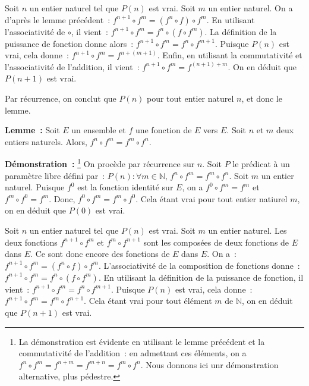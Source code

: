     Soit $n$ un entier naturel tel que $P(n)$ est vrai. 
    Soit $m$ un entier naturel. 
    On a d'après le lemme précédent : $f^{n+1} \circ f^m = (f^n \circ f) \circ f^m$. 
    En utilisant l'associativité de $\circ$, il vient : $f^{n+1} \circ f^m = f^n \circ (f \circ f^m)$. 
    La définition de la puissance de fonction donne alors : $f^{n+1} \circ f^m = f^n \circ f^{m+1}$. 
    Puisque $P(n)$ est vrai, cela donne : $f^{n+1} \circ f^m = f^{n+(m+1)}$. 
    Enfin, en utilisant la commutativité et l'associativité de l'addition, il vient : $f^{n+1} \circ f^m = f^{(n+1)+m}$. 
    On en déduit que $P(n+1)$ est vrai. 

    Par récurrence, on conclut que $P(n)$ pour tout entier naturel $n$, et donc le lemme.

   \done 

\medskip

\noindent\textbf{Lemme :} 
    Soit $E$ un ensemble et $f$ une fonction de $E$ vers $E$.
    Soit $n$ et $m$ deux entiers naturels. 
    Alors, $f^n \circ f^m = f^m \circ f^n$.

\medskip

\noindent\textbf{Démonstration :}%
    \footnote{La démonstration est évidente en utilisant le lemme précédent et la commutativité de l'addition : en admettant ces éléments, on a $f^n \circ f^m = f^{n+m} = f^{m+n} = f^m \circ f^n$.
    Nous donnons ici unr démonstration alternative, plus pédestre.}
    On procède par récurrence sur $n$.
    Soit $P$ le prédicat à un paramètre libre défini par : $P(n): \forall m \in \mathbb{N}, \, f^n \circ f^m = f^m \circ f^n$. 
    Soit $m$ un entier naturel. 
    Puisque $f^0$ est la fonction identité sur $E$, on a $f^0 \circ f^m = f^m$ et $f^m \circ f^0 = f^m$.
    Donc, $f^0 \circ f^m = f^m \circ f^0$. 
    Cela étant vrai pour tout entier natiurel $m$, on en déduit que $P(0)$ est vrai.

    Soit $n$ un entier naturel tel que $P(n)$ est vrai. 
    Soit $m$ un entier naturel. 
    Les deux fonctions $f^{n+1} \circ f^m$ et $f^m \circ f^{n+1}$ sont les composées de deux fonctions de $E$ dans $E$. 
    Ce sont donc encore des fonctions de $E$ dans $E$. 
    On a : $f^{n+1} \circ f^m = (f^n \circ f) \circ f^m$.
    L'associativité de la composition de fonctions donne : $f^{n+1} \circ f^m = f^n \circ (f \circ f^m)$.
    En utilisant la définition de la puissance de fonction, il vient : $f^{n+1} \circ f^m = f^n \circ f^{m+1}$.
    Puisque $P(n)$ est vrai, cela donne : $f^{n+1} \circ f^m = f^m \circ f^{n+1}$. 
    Cela étant vrai pour tout élément $m$ de $\mathbb{N}$, on en déduit que $P(n+1)$ est vrai. 

